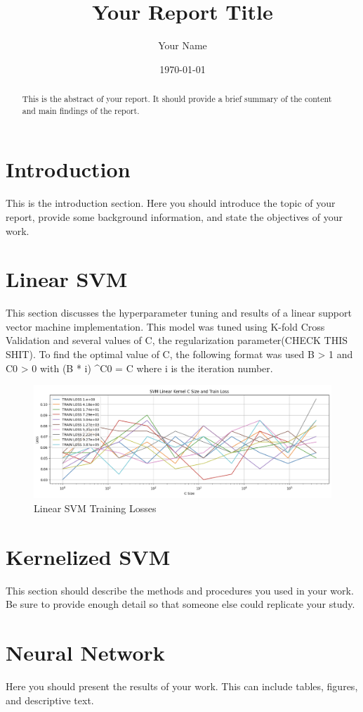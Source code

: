 \documentclass[12pt]{article}
\title{Your Report Title}
\author{Your Name}
\date{\today}
\begin{document}
\maketitle

\begin{abstract}
This is the abstract of your report. It should provide a brief summary of the content and main findings of the report.
\end{abstract}

\section{Introduction}
This is the introduction section. Here you should introduce the topic of your report, provide some background information, and state the objectives of your work.

\section{Linear SVM }
This section discusses the hyperparameter tuning and results of a linear support vector machine implementation. This model was tuned using K-fold Cross Validation and several values of C, the regularization parameter(CHECK THIS SHIT). To find the optimal value of C, the following format was used B > 1 and C0 > 0 with (B * i) ^C0 = C where i is the iteration number. 
\begin{figure}
    \centering
    \includegraphics{Assets/LinearSVM_TrainLosses.png}
    \caption{Linear SVM Training Losses}
\end{figure}

\section{Kernelized SVM}
This section should describe the methods and procedures you used in your work. Be sure to provide enough detail so that someone else could replicate your study.

\section{Neural Network}
Here you should present the results of your work. This can include tables, figures, and descriptive text.
\end{document}

